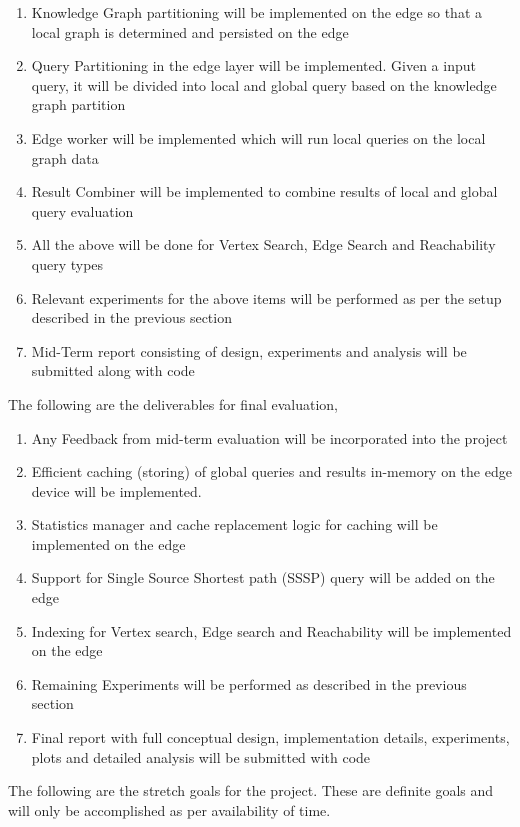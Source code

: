\documentclass[conference]{IEEEtran}
\begin{document}
\begin{enumerate}
	\item Knowledge Graph partitioning will be implemented on the edge so that a local graph is determined and persisted on the edge  
	\item Query Partitioning in the edge layer will be implemented. Given a input query, it will be divided into local and global query based on the knowledge graph partition
	\item Edge worker will be implemented which will run local queries on the local graph data
	\item Result Combiner will be implemented to combine results of local and global query evaluation
	\item All the above will be done for Vertex Search, Edge Search and Reachability query types
	\item Relevant experiments for the above items will be performed as per the setup described in the previous section 
	\item Mid-Term report consisting of design, experiments and analysis will be submitted along with code
\end{enumerate}

The following are the deliverables for final evaluation,

\begin{enumerate}
	\item Any Feedback from mid-term evaluation will be incorporated into the project
    \item Efficient caching (storing) of global queries and results in-memory on the edge device will be implemented. 
    \item Statistics manager and cache replacement logic for caching will be implemented on the edge
    \item Support for Single Source Shortest path (SSSP) query will be added on the edge
    \item Indexing for Vertex search, Edge search and Reachability will be implemented on the edge
    \item Remaining Experiments will be performed as described in the previous section
    \item Final report with full conceptual design, implementation details, experiments, plots and detailed analysis will be submitted with code
\end{enumerate}

The following are the stretch goals for the project. These are definite goals and will only be accomplished as per availability of time. 
\end{document}
